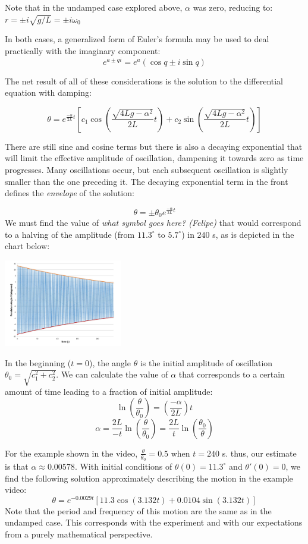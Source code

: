 \documentclass{ximera}
\begin{document}
Note that in the undamped case explored above, $\alpha$ was zero, reducing to:
$r=\pm i\sqrt{g/L}=\pm i\omega_0$

In both cases, a generalized form of Euler’s formula may be used to deal practically with the imaginary component:
$$e^{a\pm qi}=e^{a}(\cos q\pm i\sin q)$$

The net result of all of these considerations is the solution to the differential equation with damping:

$$\theta=e^{\frac{-\alpha}{2L}t}\left[c_1\cos \left(\frac{\sqrt{4Lg-\alpha^2}}{2L}t\right)+c_2\sin\left(\frac{\sqrt{4Lg-\alpha^2}}{2L}t\right)\right]$$

There are still sine and cosine terms but there is also a decaying exponential that will limit the effective amplitude of oscillation, dampening it towards zero as time progresses.  Many oscillations occur, but each subsequent oscillation is slightly smaller than the one preceding it.  The decaying exponential term in the front defines
the \emph{envelope} of the solution: 

$$\theta=\pm\theta_0 e^{\frac{-\alpha}{2L}t}$$
We must find the value of \emph{what symbol goes here? (Felipe)} that would correspond to a halving of the amplitude (from $11.3^\circ$ to $5.7^\circ$) in $240$ s, as is depicted in the chart below: 
\begin{image}
 \includegraphics[height=1.5in]{simplePendulum.jpg}
\end{image}
In the beginning ($t=0$), the angle $\theta$ is the initial amplitude of oscillation $\theta_0=\sqrt{c_1^2+c_2^2}$.  We can calculate the value of $\alpha$ that corresponds to a certain amount of time leading to a fraction of initial amplitude:
$$\ln\left(\frac{\theta}{\theta_0}\right)=\left(\frac{-\alpha}{2L}\right)t$$
$$\alpha=\frac{2L}{-t}\ln\left(\frac{\theta}{\theta_0}\right)=\frac{2L}{t}\ln\left(\frac{\theta_0}{\theta}\right)$$

For the example shown in the video, $\frac{\theta}{\theta_0}=0.5$ when $t=240$ s.  thus, our estimate is that $\alpha\approx 0.00578$.  With initial conditions of $\theta (0)=11.3^\circ$ and $\theta'(0)=0$, we find the following solution approximately describing the motion in the example video:
$$\theta=e^{-0.0029t}\left[11.3\cos(3.132t)+0.0104\sin(3.132t)\right]$$
Note that the period and frequency of this motion are the same as in the undamped case.  This corresponds with the experiment and with our expectations from a purely mathematical perspective.  
\end{document}
